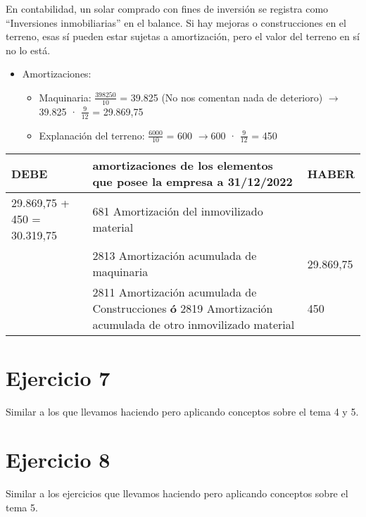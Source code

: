 \documentclass[a4paper,12pt]{article}
\newcommand{\fec}{31/12/}
\newcommand{\AIM}{681 Amortización del inmovilizado material }
\newcommand{\AAMAQ}{2813 Amortización acumulada de maquinaria }
\newcommand{\myequation}[2]{\ensuremath{\frac{#1}{#2}}}
\newcommand{\flechita}{$\rightarrow$}
\begin{document}
\begin{tcolorbox}[colback=red!5!white, colframe=yellow!75!black, title=NOTA]
    En contabilidad, un solar comprado con fines de inversión se registra como ``Inversiones inmobiliarias'' en el balance. Si hay mejoras o construcciones en el terreno, esas sí pueden estar sujetas a amortización, pero el valor del terreno en sí no lo está.
\end{tcolorbox}

\begin{itemize}
    \item Amortizaciones:
    \begin{itemize}
        \item Maquinaria: \myequation{398250}{10} = 39.825 (No nos comentan nada de deterioro) \flechita 39.825 · \myequation{9}{12} = 29.869,75
        \item Explanación del terreno: \myequation{6000}{10} = 600 \flechita 600 · \myequation{9}{12} = 450
    \end{itemize}
\end{itemize}
\begin{table}[H]
    \centering
    \begin{tabular}{|p{3cm}|p{6cm}|p{3cm}|}
    \hline
    \textbf{DEBE} & \textbf{amortizaciones de los elementos que posee la empresa a \fec2022} & \textbf{HABER} \\
    \hline
    29.869,75 + 450 = 30.319,75 & \AIM & \\
    \hline
    & \AAMAQ& 29.869,75\\
    \hline
    &  2811 Amortización acumulada de Construcciones \textbf{ó} 2819 Amortización acumulada de otro inmovilizado material& 450 \\
    \hline
    \end{tabular}
\end{table}

\section{Ejercicio 7}
Similar a los que llevamos haciendo pero aplicando conceptos sobre el tema 4 y 5.

\section{Ejercicio 8}
Similar a los ejercicios que llevamos haciendo pero aplicando conceptos sobre el tema 5.
\end{document}
